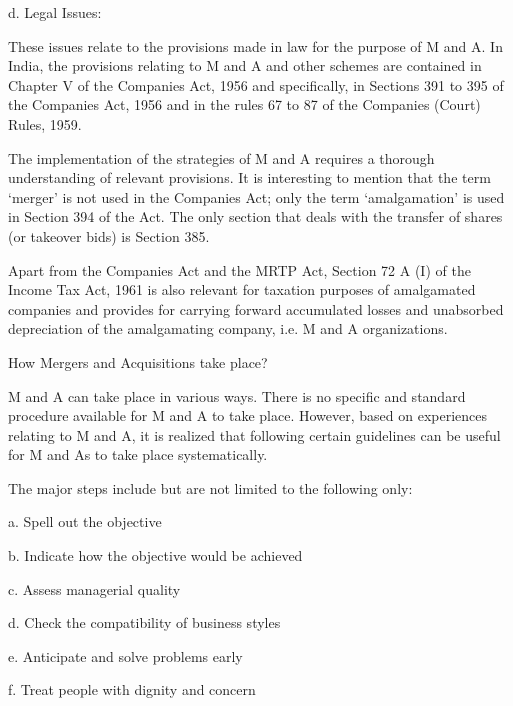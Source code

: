 \documentclass{article}
\begin{document}
d. Legal Issues:

These issues relate to the provisions made in law for the purpose of M and A. In India, the provisions relating to M and A and other
 schemes are contained in Chapter V of the Companies Act, 1956 and specifically, in Sections 391 to 395 of the Companies Act, 1956 and
  in the rules 67 to 87 of the Companies (Court) Rules, 1959.

The implementation of the strategies of M and A requires a thorough understanding of relevant provisions. It is interesting to mention
 that the term ‘merger’ is not used in the Companies Act; only the term ‘amalgamation’ is used in Section 394 of the Act. 
 The only section that deals with the transfer of shares (or takeover bids) is Section 385.

Apart from the Companies Act and the MRTP Act, Section 72 A (I) of the Income Tax Act, 1961 is also relevant for taxation
 purposes of amalgamated companies and provides for carrying forward accumulated losses and unabsorbed depreciation of the
  amalgamating company, i.e. M and A organizations.

How Mergers and Acquisitions take place?

M and A can take place in various ways. There is no specific and standard procedure available for M and A to take place. 
However, based on experiences relating to M and A, it is realized that following certain guidelines can be useful for M and 
 As to take place systematically.

The major steps include but are not limited to the following only:

a. Spell out the objective

b. Indicate how the objective would be achieved

c. Assess managerial quality

d. Check the compatibility of business styles

e. Anticipate and solve problems early

f. Treat people with dignity and concern 
\end{document}
